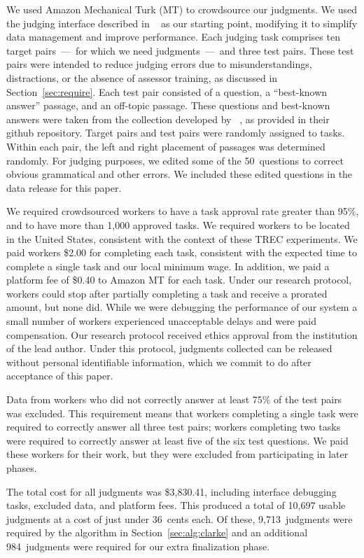 We used Amazon Mechanical Turk (MT) to crowdsource our judgments. We used the judging interface described in ~\citet{cvs21} as our starting point, modifying it to simplify data management and improve performance. Each judging task comprises ten target pairs~---~for which we need judgments~---~and three test pairs. These test pairs were intended to reduce judging errors due to misunderstandings, distractions, or the absence of assessor training, as discussed in Section~\ref{sec:require}. Each test pair consisted of a question, a ``best-known answer'' passage, and an off-topic passage. These questions and best-known answers were taken from the collection developed by ~\citet{cvs21}, as provided in their github repository. Target pairs and test pairs were randomly assigned to tasks. Within each pair, the left and right placement of passages was determined randomly. For judging purposes, we edited some of the 50~questions to correct obvious grammatical and other errors. We included these edited questions in the data release for this paper. 

We required crowdsourced workers to have a task approval rate greater than 95\%, and to have more than 1,000 approved tasks. We required workers to be located in the United States, consistent with the context of these TREC experiments. We paid workers \$2.00 for completing each task, consistent with the expected time to complete a single task and our local minimum wage. In addition, we paid a platform fee of \$0.40 to Amazon MT for each task. Under our research protocol, workers could stop after partially completing a task and receive a prorated amount, but none did. While we were debugging the performance of our system a small number of workers experienced unacceptable delays and were paid compensation. Our research protocol received ethics approval from the institution of the lead author. Under this protocol, judgments collected can be released without personal identifiable information, which we commit to do after acceptance of this paper.

Data from workers who did not correctly answer at least 75\% of the test pairs was excluded. This requirement means that workers completing a single task were required to correctly answer all three test pairs; workers completing two tasks were required to correctly answer at least five of the six test questions. We paid these workers for their work, but they were excluded from participating in later phases. 

The total cost for all judgments was \$3,830.41, including interface debugging tasks, excluded data, and platform fees. This produced a total of 10,697 usable judgments at a cost of just under 36~cents each. Of these, 9,713~judgments were required by the algorithm in Section~\ref{sec:alg:clarke} and an additional 984~judgments were required for our extra finalization phase.


